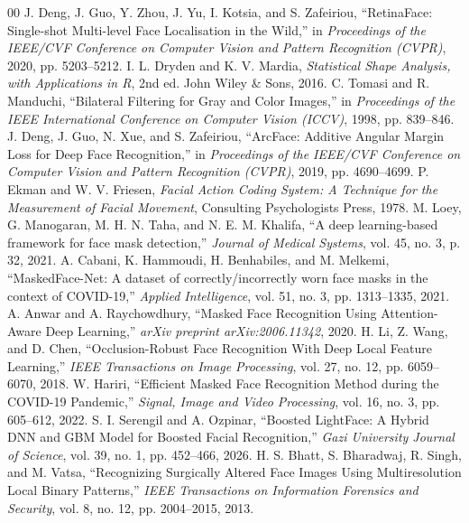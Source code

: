 \documentclass{article} %
\begin{document}
% 
% 
\begin{thebibliography}{00}
 J. Deng, J. Guo, Y. Zhou, J. Yu, I. Kotsia, and S. Zafeiriou, ``RetinaFace: Single-shot Multi-level Face Localisation in the Wild,'' in \textit{Proceedings of the IEEE/CVF Conference on Computer Vision and Pattern Recognition (CVPR)}, 2020, pp. 5203--5212.
 I. L. Dryden and K. V. Mardia, \textit{Statistical Shape Analysis, with Applications in R}, 2nd ed. John Wiley \& Sons, 2016.
 C. Tomasi and R. Manduchi, ``Bilateral Filtering for Gray and Color Images,'' in \textit{Proceedings of the IEEE International Conference on Computer Vision (ICCV)}, 1998, pp. 839--846.
 J. Deng, J. Guo, N. Xue, and S. Zafeiriou, ``ArcFace: Additive Angular Margin Loss for Deep Face Recognition,'' in \textit{Proceedings of the IEEE/CVF Conference on Computer Vision and Pattern Recognition (CVPR)}, 2019, pp. 4690--4699.
 P. Ekman and W. V. Friesen, \textit{Facial Action Coding System: A Technique for the Measurement of Facial Movement}, Consulting Psychologists Press, 1978.
 M. Loey, G. Manogaran, M. H. N. Taha, and N. E. M. Khalifa, ``A deep learning-based framework for face mask detection,'' \textit{Journal of Medical Systems}, vol. 45, no. 3, p. 32, 2021.
 A. Cabani, K. Hammoudi, H. Benhabiles, and M. Melkemi, ``MaskedFace-Net: A dataset of correctly/incorrectly worn face masks in the context of COVID-19,'' \textit{Applied Intelligence}, vol. 51, no. 3, pp. 1313--1335, 2021.
 A. Anwar and A. Raychowdhury, ``Masked Face Recognition Using Attention-Aware Deep Learning,'' \textit{arXiv preprint arXiv:2006.11342}, 2020.
 H. Li, Z. Wang, and D. Chen, ``Occlusion-Robust Face Recognition With Deep Local Feature Learning,'' \textit{IEEE Transactions on Image Processing}, vol. 27, no. 12, pp. 6059--6070, 2018.
 W. Hariri, ``Efficient Masked Face Recognition Method during the COVID-19 Pandemic,'' \textit{Signal, Image and Video Processing}, vol. 16, no. 3, pp. 605--612, 2022.
 S. I. Serengil and A. Ozpinar, ``Boosted LightFace: A Hybrid DNN and GBM Model for Boosted Facial Recognition,'' \textit{Gazi University Journal of Science}, vol. 39, no. 1, pp. 452--466, 2026.
 H. S. Bhatt, S. Bharadwaj, R. Singh, and M. Vatsa, ``Recognizing Surgically Altered Face Images Using Multiresolution Local Binary Patterns,'' \textit{IEEE Transactions on Information Forensics and Security}, vol. 8, no. 12, pp. 2004--2015, 2013.

\end{thebibliography}
\end{document}
